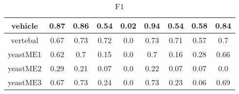 \begin{table}[h]
\begin{center}
{\begin{tabular}{|c|c|c|c|c|c|c|c|c|}
						\hline%
						vehicle&0.87&0.86&0.54&0.02&0.94&0.54&0.58&0.84\\%
						\hline%
						vertebal&0.67&0.73&0.72&0.0&0.73&0.71&0.57&0.7\\%
						\hline%
						yeastME1&0.62&0.7&0.15&0.0&0.7&0.16&0.28&0.66\\%
						\hline%
						yeastME2&0.29&0.21&0.07&0.0&0.22&0.07&0.07&0.0\\%
						\hline%
						yeastME3&0.67&0.73&0.24&0.0&0.73&0.23&0.06&0.69\\%
						\hline%
					\end{tabular}}%
						\caption{F1}
						\label{tab4}
					\end{center}
				\end{table}
